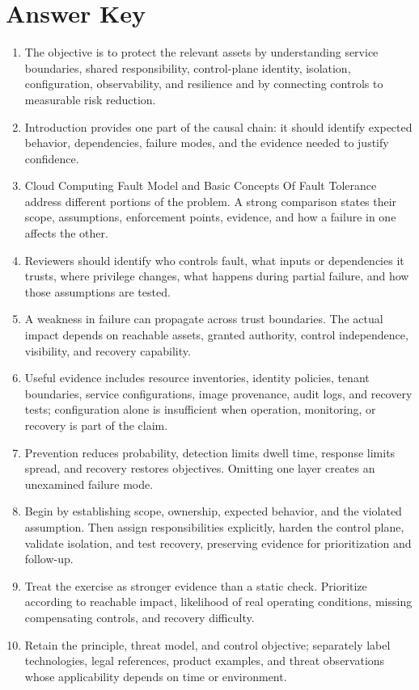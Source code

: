 \documentclass[11pt]{article}
\begin{document}
\section*{Answer Key}
\begin{enumerate}
\item The objective is to protect the relevant assets by understanding service boundaries, shared responsibility, control-plane identity, isolation, configuration, observability, and resilience and by connecting controls to measurable risk reduction.
\item Introduction provides one part of the causal chain: it should identify expected behavior, dependencies, failure modes, and the evidence needed to justify confidence.
\item Cloud Computing Fault Model and Basic Concepts Of Fault Tolerance address different portions of the problem. A strong comparison states their scope, assumptions, enforcement points, evidence, and how a failure in one affects the other.
\item Reviewers should identify who controls fault, what inputs or dependencies it trusts, where privilege changes, what happens during partial failure, and how those assumptions are tested.
\item A weakness in failure can propagate across trust boundaries. The actual impact depends on reachable assets, granted authority, control independence, visibility, and recovery capability.
\item Useful evidence includes resource inventories, identity policies, tenant boundaries, service configurations, image provenance, audit logs, and recovery tests; configuration alone is insufficient when operation, monitoring, or recovery is part of the claim.
\item Prevention reduces probability, detection limits dwell time, response limits spread, and recovery restores objectives. Omitting one layer creates an unexamined failure mode.
\item Begin by establishing scope, ownership, expected behavior, and the violated assumption. Then assign responsibilities explicitly, harden the control plane, validate isolation, and test recovery, preserving evidence for prioritization and follow-up.
\item Treat the exercise as stronger evidence than a static check. Prioritize according to reachable impact, likelihood of real operating conditions, missing compensating controls, and recovery difficulty.
\item Retain the principle, threat model, and control objective; separately label technologies, legal references, product examples, and threat observations whose applicability depends on time or environment.
\end{enumerate}
\end{document}
